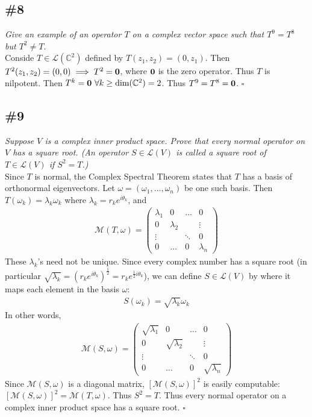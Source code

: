 \documentclass[12pt]{article}
\begin{document}
\subsection*{\#8}
{\it Give an example of an operator $T$ on a complex vector space such that $T^9 = T^8$ but $T^2 \neq T$.} \\

\noindent Conside $T \in \mathcal{L}(\mathbb{C}^2)$ defined by $T(z_1, z_2) = (0, z_1)$.  Then $T^2(z_1, z_2) = (0, 0) \implies T^2 = \bf{0}$, where $\bf{0}$ is the zero operator.  Thus $T$ is nilpotent.  Then $T^k = {\bf0}\ \forall k \geq \text{dim}(\mathbb{C}^2) = 2$.  Thus $T^9 = T^8 = {\bf 0}$. \hfill $\square$

\subsection*{\#9}
{\it Suppose $V$ is a complex inner product space.  Prove that every normal operator on $V$ has a square root.  (An operator $S \in \mathcal{L}(V)$ is called a square root of $T \in \mathcal{L}(V)$ if $S^2 = T$.)} \\

\noindent Since $T$ is normal, the Complex Spectral Theorem states that $T$ has a basis of orthonormal eigenvectors.  Let $\omega = (\omega_1, \dots, \omega_n)$ be one such basis.  Then $T(\omega_k) = \lambda_k\omega_k$ where $\lambda_k = r_ke^{i\theta_k}$, and
\begin{align*}
		\mathcal{M}(T, \omega) = \left(\begin{array}{cccc}
				\lambda_1 & 0 & \dots & 0 \\
				0 & \lambda_2 & & \vdots \\
				\vdots & & \ddots & 0 \\
				0 & \dots & 0 & \lambda_n
		\end{array}\right)
\end{align*}
These $\lambda_k$'s need not be unique.  Since every complex number has a square root (in particular $\sqrt{\lambda_k} = (r_ke^{i\theta_k})^{\frac{1}{2}} = r_ke^{\frac{1}{2}i\theta_k}$), we can define $S \in \mathcal{L}(V)$ by where it maps each element in the basis $\omega$:
\begin{align*}
		S(\omega_k) = \sqrt{\lambda_k}\omega_k
\end{align*}
In other words,
\begin{align*}
		\mathcal{M}(S, \omega) = \left(\begin{array}{cccc}
				\sqrt{\lambda_1} & 0 & \dots & 0 \\
				0 & \sqrt{\lambda_2} & & \vdots \\
				\vdots & & \ddots & 0 \\
				0 & \dots & 0 & \sqrt{\lambda_n}
		\end{array}\right)
\end{align*}
Since $\mathcal{M}(S, \omega)$ is a diagonal matrix, $[\mathcal{M}(S, \omega)]^2$ is easily computable: $[\mathcal{M}(S, \omega)]^2 = \mathcal{M}(T, \omega)$.  Thus $S^2 = T$.  Thus every normal operator on a complex inner product space has a square root. \hfill $\square$
\end{document}
